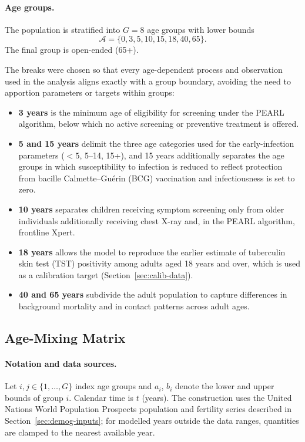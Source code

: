 \documentclass[11pt]{article}
\begin{document}
\paragraph{Age groups.}
The population is stratified into \(G = 8\) age groups with lower bounds
\[
\mathcal{A} = \{0, 3, 5, 10, 15, 18, 40, 65\}.
\]
The final group is open-ended (65+).

The breaks were chosen so that every age-dependent process and observation used in the analysis aligns exactly with a group boundary, avoiding the need to apportion parameters or targets within groups:

\begin{itemize}
\item \textbf{3 years} is the minimum age of eligibility for screening under the PEARL algorithm, below which no active screening or preventive treatment is offered.
\item \textbf{5 and 15 years} delimit the three age categories used for the early-infection parameters (\(<5\), 5--14, 15+), and 15 years additionally separates the age groups in which susceptibility to infection is reduced to reflect protection from bacille Calmette--Gu\'erin (BCG) vaccination and infectiousness is set to zero.
\item \textbf{10 years} separates children receiving symptom screening only from older individuals additionally receiving chest X-ray and, in the PEARL algorithm, frontline Xpert.
\item \textbf{18 years} allows the model to reproduce the earlier estimate of tuberculin skin test (TST) positivity among adults aged 18 years and over, which is used as a calibration target (Section~\ref{sec:calib-data}).
\item \textbf{40 and 65 years} subdivide the adult population to capture differences in background mortality and in contact patterns across adult ages.
\end{itemize}

\subsection{Age-Mixing Matrix}
\label{sec:mixing-matrix}

\paragraph{Notation and data sources.}
Let \(i,j \in \{1,\dots,G\}\) index age groups and $a_{i}$, $b_{i}$ denote the lower and upper bounds of group \(i\). Calendar time is \(t\) (years). 
The construction uses the United Nations World Population Prospects population and fertility series described in Section~\ref{sec:demog-inputs}; for modelled years outside the data ranges, quantities are clamped to the nearest available year.
\end{document}
